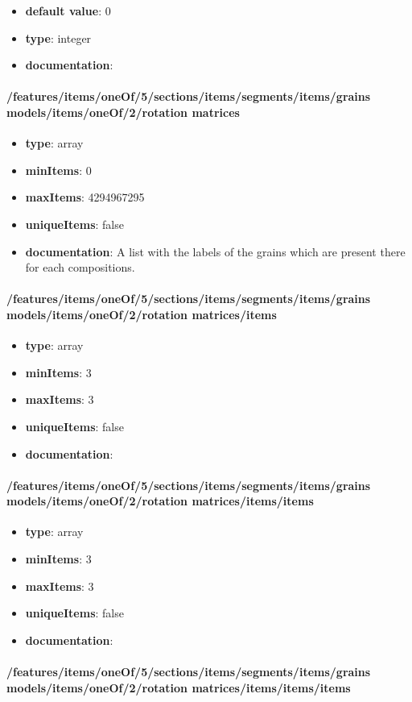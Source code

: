 \begin{itemize}\item {\bf default value}: 0
\item {\bf type}: integer
\item {\bf documentation}: 
\end{itemize}\paragraph{/features/items/oneOf/5/sections/items/segments/items/grains models/items/oneOf/2/rotation matrices}
\begin{itemize}\item {\bf type}: array
\item {\bf minItems}: 0
\item {\bf maxItems}: 4294967295
\item {\bf uniqueItems}: false
\item {\bf documentation}: A list with the labels of the grains which are present there for each compositions.
\end{itemize}\paragraph{/features/items/oneOf/5/sections/items/segments/items/grains models/items/oneOf/2/rotation matrices/items}
\begin{itemize}\item {\bf type}: array
\item {\bf minItems}: 3
\item {\bf maxItems}: 3
\item {\bf uniqueItems}: false
\item {\bf documentation}: 
\end{itemize}\paragraph{/features/items/oneOf/5/sections/items/segments/items/grains models/items/oneOf/2/rotation matrices/items/items}
\begin{itemize}\item {\bf type}: array
\item {\bf minItems}: 3
\item {\bf maxItems}: 3
\item {\bf uniqueItems}: false
\item {\bf documentation}: 
\end{itemize}\paragraph{/features/items/oneOf/5/sections/items/segments/items/grains models/items/oneOf/2/rotation matrices/items/items/items}
